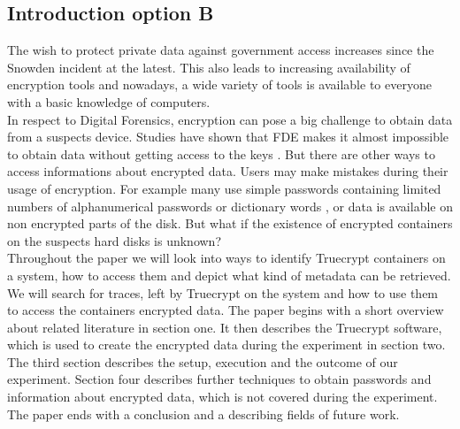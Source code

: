 \subsection{Introduction option B}
The wish to protect private data against government access increases since the Snowden incident at the latest. 
This also leads to increasing availability of encryption tools and nowadays, a wide variety of tools is available to everyone with a basic knowledge of computers.
\\
In respect to Digital Forensics, encryption can pose a big challenge to obtain data from a suspects device. 
Studies have shown that \gls{FDE} makes it almost impossible to obtain data without getting access to the keys \cite{Casey2011129}. 
But there are other ways to access informations about encrypted data.
Users may make mistakes during their usage of encryption. 
For example many use simple passwords containing limited numbers of alphanumerical passwords or dictionary words \cite{worstpractise}, or data is available on non encrypted parts of the disk. 
But what if the existence of encrypted containers on the suspects hard disks is unknown?
\\
Throughout the paper we will look into ways to identify Truecrypt containers on a system, how to access them and depict what kind of metadata can be retrieved.
We will search for traces, left by Truecrypt on the system and how to use them to access the containers encrypted data.
The paper begins with a short overview about related literature in section one. 
It then describes the Truecrypt software, which is used to create the encrypted data during the experiment in section two. 
The third section describes the setup, execution and the outcome of our experiment. 
Section four describes further techniques to obtain passwords and information about encrypted data, which is not covered during the experiment. 
The paper ends with a conclusion and a describing fields of future work.
